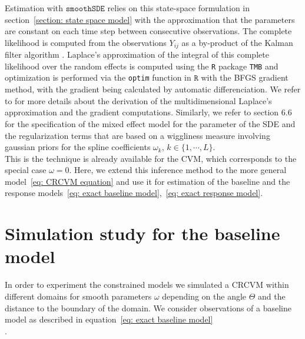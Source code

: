\documentclass[11pt]{article}
\newcommand {\1}{\mathbb{1}}
\theoremstyle{definition}
\theoremstyle{remark}
\theoremstyle{remark}
\begin{document}
Estimation with $\texttt{smoothSDE}$ relies on this state-space formulation in section~\ref{section: state space model} with the approximation that the parameters are constant on each time step between consecutive observations.
The complete likelihood is computed from the observations $Y_{ij}$ as a by-product of the Kalman filter algorithm \cite{michelot_varying-coefficient_2021}.
Laplace's approximation of the integral of this complete likelihood over the random effects is computed using the \texttt{R} package \texttt{TMB}  and optimization is performed via the \texttt{optim} function in $\texttt{R}$ with the BFGS gradient method, with the gradient being calculated by automatic differenciation. We refer to \cite{kristensen_tmb_2016} for more details about the derivation of the multidimensional Laplace's approximation and the gradient computations. Similarly, we refer to \cite{wood_generalized_2017} section $6.6$ for the specification of the mixed effect model for the parameter of the SDE and the regularization terms that are based on a wiggliness measure involving gaussian priors for the spline coefficients $\omega_k$, $k \in \{1,\cdots,L\}$. \\
This is the technique is already available for the CVM, which corresponds to the special case $\omega=0$. Here, we extend this inference method to the more general model~\ref{eq: CRCVM equation} and use it for estimation of the baseline and the response models~\ref{eq: exact baseline model},~\ref{eq: exact response model}.




\section{Simulation study for the baseline model}
\label{section: simulation constrained motion}
In order to experiment the constrained models we simulated a CRCVM within different domains for smooth parameters $\omega$ depending on the angle $\Theta$ and the distance to the boundary of the domain. We consider observations of a baseline model as described in equation~\ref{eq: exact baseline model}\\.
\end{document}
